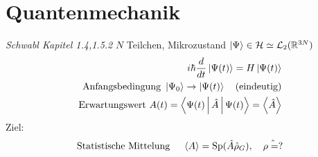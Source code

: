 \documentclass[11pt]{article}
\theoremstyle{plain}
\newcommand{\R}{\mathbb{R}}
\begin{document}
\section{Quantenmechanik}
\emph{Schwabl Kapitel 1.4,1.5.2}
$N $ Teilchen, Mikrozustand $\Ket{\Psi} \in \mathcal{H} \simeq \mathcal{L}_2(\R^{3N})$
\begin{align*}
  i \hbar \frac{d}{dt} \Ket{\Psi(t)} = H \Ket{\Psi(t)} \\
  \text{Anfangsbedingung } \Ket{\Psi_0} \to \Ket{\Psi(t)} \quad \text{(eindeutig)} \\
  \text{Erwartungswert } A(t)= \Braket{\Psi(t) | \hat{A} | \Psi(t)} =\Braket{\hat{A}} \\
\end{align*}
Ziel: \[ \text{Statistische Mittelung } \quad \Braket{A} = \operatorname{Sp}(\hat{A}\hat{\rho}_G), \quad \hat{\rho=?} \] 
\end{document}
